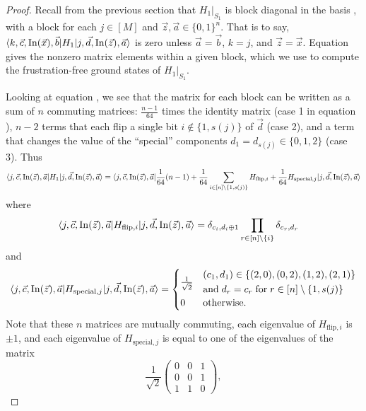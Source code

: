 \documentclass[../thesis-main/thesis-main]{subfiles}
\begin{document}
\begin{proof}
Recall from the previous section that $H_{1}|_{S_1}$ is block diagonal in the basis , with a block for each $j\in[M]$ and $\vec{z},\vec{a}\in\{0,1\}^{n}$. That is to say, $\langle k,\vec{c},\operatorname{In}(\vec{x}),\vec{b}|H_{1}|j,\vec{d},\operatorname{In}(\vec{z}),\vec{a}\rangle$ is zero unless $\vec{a}=\vec{b}$, $k=j$, and $\vec{z}=\vec{x}$. Equation  gives the nonzero matrix elements within a given block, which we use to compute the frustration-free ground states of $H_{1}|_{S_{1}}$.

Looking at equation , we see that the matrix for each block can be written as a sum of $n$ commuting matrices: $\frac{n-1}{64}$ times the identity matrix (case 1 in equation ), $n-2$ terms that each flip a single bit $i\notin\{1,s(j)\}$ of $\vec{d}$ (case 2), and a term that changes the value of the ``special'' components $d_{1}=d_{s(j)}\in\{0,1,2\}$ (case 3). Thus
\[
\langle j,\vec{c},\operatorname{In}(\vec{z}),\vec{a}|H_{1}|j,\vec{d},\operatorname{In}(\vec{z}),\vec{a}\rangle=\langle j,\vec{c},\operatorname{In}(\vec{z}),\vec{a}|\frac{1}{64}(n-1)+\frac{1}{64}\sum_{i\in[n]\setminus\{1,s(j)\}}H_{\mathrm{flip},i}+\frac{1}{64}H_{\mathrm{special},j}|j,\vec{d},\operatorname{In}(\vec{z}),\vec{a}\rangle
\]
where
\begin{align*}
\langle j,\vec{c},\operatorname{In}(\vec{z}),\vec{a}|H_{\mathrm{flip},i}|j,\vec{d},\operatorname{In}(\vec{z}),\vec{a}\rangle &= \delta_{c_{i},d_{i}\oplus1} \prod_{r\in[n]\setminus\{i\}}\delta_{c_{r},d_{r}}
\end{align*}
and 
\[
\langle j,\vec{c},\operatorname{In}(\vec{z}),\vec{a}|H_{\mathrm{special},j}|j,\vec{d},\operatorname{In}(\vec{z}),\vec{a}\rangle=\begin{cases}
\frac{1}{\sqrt{2}} & \begin{aligned}
  &(c_{1},d_{1})\in\{(2,0),(0,2),(1,2),(2,1)\}\\ 
  &\text{and}\; d_{r}=c_{r}\;\text{for}\; r\in [n]\setminus\{1,s(j)\}
\end{aligned}\\
0 & \text{otherwise.}
\end{cases}
\]
Note that these $n$ matrices are mutually commuting, each eigenvalue of $H_{\mathrm{flip},i}$ is $\pm1$, and each eigenvalue of $H_{\mathrm{special},j}$ is equal to one of the eigenvalues of the matrix 
\[
\frac{1}{\sqrt{2}}\begin{pmatrix}
0 & 0 & 1\\
0 & 0 & 1\\
1 & 1 & 0
\end{pmatrix},
\]
\end{proof}
\end{document}
